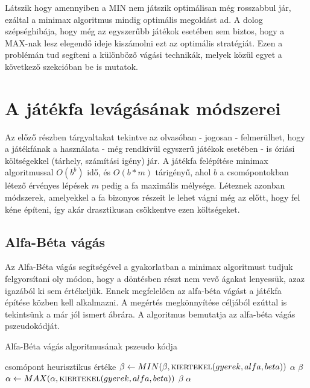 Látszik hogy amennyiben a MIN nem játszik optimálisan még rosszabbul jár, ezáltal a minimax algoritmus mindig optimális megoldást ad. A dolog szépséghibája, hogy még az egyszerűbb játékok esetében sem biztos, hogy a MAX-nak lesz elegendő ideje kiszámolni ezt az optimális stratégiát. Ezen a problémán tud segíteni a különböző vágási technikák, melyek közül egyet a következő szekcióban be is mutatok.


\section{A játékfa levágásának módszerei}
Az előző részben tárgyaltakat tekintve az olvasóban - jogosan - felmerülhet, hogy a játékfának a használata - még rendkívül egyszerű játékok esetében - is óriási költségekkel (tárhely, számítási igény) jár. A játékfa felépítése minimax algoritmussal $O(b^b)$ idő, és $O(b*m)$ tárigényű, ahol $b$ a csomópontokban létező érvényes lépések $m$ pedig a fa maximális mélysége. Léteznek azonban módszerek, amelyekkel a fa bizonyos részeit le lehet vágni még az előtt, hogy fel kéne építeni, így akár drasztikusan csökkentve ezen költségeket.

\subsection{Alfa-Béta vágás}
Az Alfa-Béta vágás segítségével a gyakorlatban a minimax algoritmust tudjuk felgyorsítani oly módon, hogy a döntésben részt nem vevő ágakat lenyessük, azaz igazából ki sem értékeljük. Ennek megfelelően az alfa-béta vágást a játékfa építése közben kell alkalmazni. A megértés megkönnyítése céljából ezúttal is tekintsünk a már jól ismert  ábrára. A  algoritmus bemutatja az alfa-béta vágás pszeudokódját.\\

\begin{algorithm}
	\caption{Alfa-Béta vágás algoritmusának pszeudo kódja}
	\label{alg:alfabeta}
	\begin{algorithmic}[1]
		\State \Return csomópont heurisztikus értéke
		\EndIf
		\State $\beta \gets MIN(\beta, \Call{kiertekel}{gyerek, alfa, beta})$
		\If {$\beta <= \alpha$}
		\State \Return $\alpha$
		\EndIf
		\EndFor
		\State \Return $\beta$
		\EndIf		
		\State $\alpha \gets MAX(\alpha, \Call{kiertekel}{gyerek, alfa, beta})$
		\If {$\beta <= \alpha$}
		\State \Return $\beta$
		\EndIf
		\EndFor
		\State \Return $\alpha$
		\EndIf	
		\EndFunction
	\end{algorithmic}
\end{algorithm}


